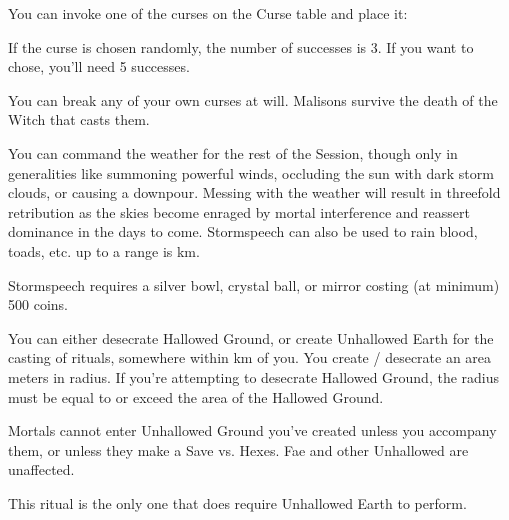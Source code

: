{\newpage

\begin{multicols}{2}

\OCCULT[
  Name=Malison,
  Link=occultism-malison,
  Success=varies,
  Cost=66,
  Widdershins=0
]

You can invoke one of the curses on the Curse table and place it: 

If the curse is chosen randomly, the number of successes is 3. If you want to chose, you'll need 5 successes.

You can break any of your own curses at will. Malisons survive the death of the Witch that casts them.

\OCCULT[
  Name=Stormspeech,  
  Link=occultism-stormspeech,
  Success=5,
  Cost=500+,
  Widdershins=1
]

You can command the weather for the rest of the Session, though only in generalities like summoning powerful winds, occluding the sun with dark storm clouds, or causing a downpour. Messing with the weather will result in threefold retribution as the skies become enraged by mortal interference and reassert dominance in the days to come. Stormspeech can also be used to rain blood, toads, etc.  up to a range is \LVL km.

Stormspeech requires a silver bowl, crystal ball, or mirror costing (at minimum) 500 coins. 

\OCCULT[
  Name=Unhallowed Earth,
  Link=occultism-unhallowed-earth,
  Success=1,
  Cost=66,
  Widdershins=0
]

You can either desecrate Hallowed Ground, or create Unhallowed Earth for the casting of rituals, somewhere within \LVL km of you.  You create / desecrate an area \LVL meters in radius.  If you're attempting to desecrate Hallowed Ground, the radius must be equal to or exceed the area of the Hallowed Ground.

Mortals cannot enter Unhallowed Ground you've created unless you accompany them, or unless they make a Save vs. Hexes.  Fae and other Unhallowed are unaffected.

This ritual is the only one that does  require Unhallowed Earth to perform.


\OCCULT[
  Name=Witch Mark,
  Link=occultism-witch-mark,
  Success=1,
  Cost=66,
  Widdershins=0
]


\end{multicols}}
